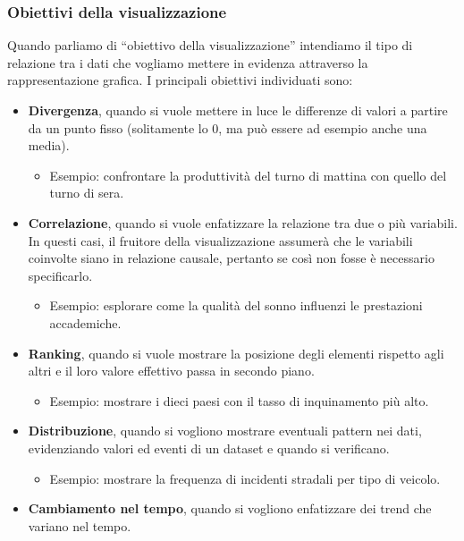 \subsubsection{Obiettivi della visualizzazione}
Quando parliamo di ``obiettivo della visualizzazione'' intendiamo il tipo di relazione tra i dati che vogliamo mettere in evidenza attraverso
la rappresentazione grafica. I principali obiettivi individuati sono:
\begin{itemize}
    \item \textbf{Divergenza}, quando si vuole mettere in luce le differenze di valori a partire da un punto fisso (solitamente lo 0, ma può essere
    ad esempio anche una media).
    \begin{itemize}
        \item Esempio: confrontare la produttività del turno di mattina con quello del turno di sera.
    \end{itemize}
    \item \textbf{Correlazione}, quando si vuole enfatizzare la relazione tra due o più variabili. In questi casi, il fruitore della visualizzazione assumerà che le 
    variabili coinvolte siano in relazione causale, pertanto se così non fosse è necessario specificarlo.
    \begin{itemize}
        \item Esempio: esplorare come la qualità del sonno influenzi le prestazioni accademiche.
    \end{itemize}
    \item \textbf{Ranking}, quando si vuole mostrare la posizione degli elementi rispetto agli altri e il loro valore effettivo passa in secondo piano.
    \begin{itemize}
        \item Esempio: mostrare i dieci paesi con il tasso di inquinamento più alto.
    \end{itemize}
    \item \textbf{Distribuzione}, quando si vogliono mostrare eventuali pattern nei dati, evidenziando valori ed eventi di un dataset e quando si verificano. 
    \begin{itemize}
        \item Esempio: mostrare la frequenza di incidenti stradali per tipo di veicolo.
    \end{itemize}
    \item \textbf{Cambiamento nel tempo}, quando si vogliono enfatizzare dei trend che variano nel tempo.
    \begin{itemize}

\end{itemize}
\end{itemize}
